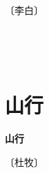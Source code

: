 \documentclass[12pt,UTF-8,openany,fontset=none]{ctexbook}
\begin{document}
\begin{center}
    \vspace{10pt}
    
    \begin{large}
        
        〔李白〕
        
    \end{large}
    
    \vspace{8pt}
    
    \begin{huge}
        
        \phantom{。}

        \phantom{。}~~
        
        \phantom{。}~~

        \phantom{。}
        
    \end{huge}
    
\end{center}

\vspace{8pt}
\clearpage


\section{山行}



\begin{center}
    {\bfseries 山行}
\end{center}

\begin{center}
    \vspace{10pt}
    
    \begin{large}
        
        〔杜牧〕
        
    \end{large}
    
    \vspace{8pt}
    
    \begin{huge}
        
        \phantom{。}

        \phantom{。}
        
        \phantom{。}

        \phantom{。}
        
    \end{huge}
    
\end{center}
\end{document}
